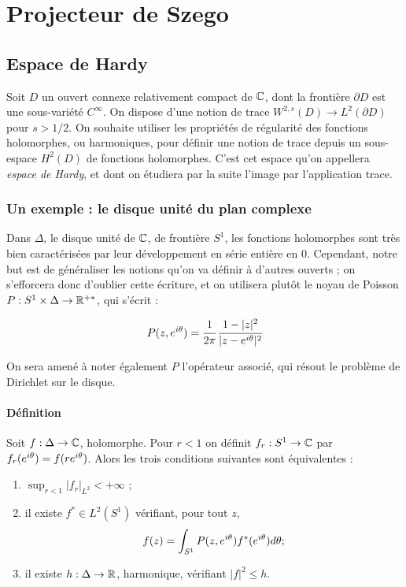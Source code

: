
\chapter{Projecteur de Szego}

\section{Espace de Hardy}

Soit $D$ un ouvert connexe relativement compact de $\mathbb{C}$, dont la frontière $\partial D$ est une sous-variété $C^{\infty}$. On dispose d'une notion de trace $W^{2,s}(D) \to L^2(\partial D)$ pour $s > 1/2$. On souhaite utiliser les propriétés de régularité des fonctions holomorphes, ou harmoniques, pour définir une notion de trace depuis un sous-espace $H^2(D)$ de fonctions holomorphes. C'est cet espace qu'on appellera \emph{espace de Hardy}, et dont on étudiera par la suite l'image par l'application trace.

\subsection{Un exemple : le disque unité du plan complexe}

Dans $\Delta$, le disque unité de $\mathbb{C}$, de frontière $S^1$, les fonctions holomorphes sont très bien caractérisées par leur développement en série entière en 0. Cependant, notre but est de généraliser les notions qu'on va définir à d'autres ouverts ; on s'efforcera donc d'oublier cette écriture, et on utilisera plutôt le noyau de Poisson $P : S^1 \times \Delta \to \mathbb{R}^{+*}$, qui s'écrit :

\begin{equation}
	P(z,e^{i\theta}) = \cfrac{1}{2\pi}\,\cfrac{1-|z|^2}{|z-e^{i\theta}|^2}
\end{equation}

On sera amené à noter également $P$ l'opérateur associé, qui résout le problème de Dirichlet sur le disque.

\subsubsection{Définition}

\begin{prop}
Soit $f : \Delta \to \mathbb{C}$, holomorphe. Pour $r <1$ on définit $f_r : S^1 \to \mathbb{C}$ par $f_r(e^{i\theta})=f(re^{i\theta})$. Alors les trois conditions suivantes sont équivalentes :
\begin{enumerate}
\item $\sup_{r<1}|f_r|_{L^2} < + \infty$ ;
\item il existe $ f^* \in L^2(S^1)$ vérifiant, pour tout $z$,
\begin{equation*}
	f(z) = \int_{S^1}P(z,e^{i\theta})f^*(e^{i\theta})d\theta ;
\end{equation*}
\item il existe $h : \Delta \to \mathbb{R}$, harmonique, vérifiant $|f|^2 \leq h$.
\end{enumerate}
\end{prop}

